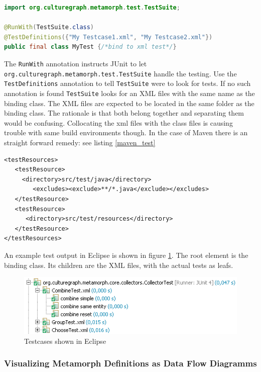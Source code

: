 \documentclass[12pt,a4paper]{article}
\begin{document}
\begin{lstlisting}[float=htb, label=test_class,caption= Binding XML test definitions to a test class., language=Java]
import org.culturegraph.metamorph.test.TestSuite;

@RunWith(TestSuite.class)
@TestDefinitions({"My Testcase1.xml", "My Testcase2.xml"})
public final class MyTest {/*bind to xml test*/}
\end{lstlisting}

The {\tt RunWith} annotation instructs JUnit to let {\tt org.culturegraph.metamorph.test.TestSuite} handle the testing.
Use the {\tt TestDefinitions} annotation to tell {\tt TestSuite} were to look for tests. If no such annotation is found {\tt TestSuite} looks for an XML files with the same name as the binding class. The XML files are expected to be located in the same folder as the binding class. The rationale is that both belong together and separating them would be confusing. Collocating the xml files with the class files is causing trouble with same build environments though. In the case of Maven there is an straight forward remedy: see listing \ref{maven_test}

\begin{lstlisting}[float=htb, label=maven_test,caption=Telling Maven not to ignore resources colocated with java files in the test source directory.]
<testResources>
   <testResource>
     <directory>src/test/java</directory>
        <excludes><exclude>**/*.java</exclude></excludes>	
   </testResource>
   <testResource>
      <directory>src/test/resources</directory>
   </testResource>
</testResources> 
\end{lstlisting}

An example test output in Eclipse is shown in figure \ref{fig:junit}. The root element is the binding class. Its children are the XML files, with the actual tests as leafs.

\begin{figure}[htp]
\centering
\includegraphics[width=.75\textwidth]{figures/junit}
\caption{Testcases shown in Eclipse}\label{fig:junit}
\end{figure}

\subsubsection{Visualizing Metamorph Definitions as Data Flow Diagramms}\label{vis}
\end{document}
